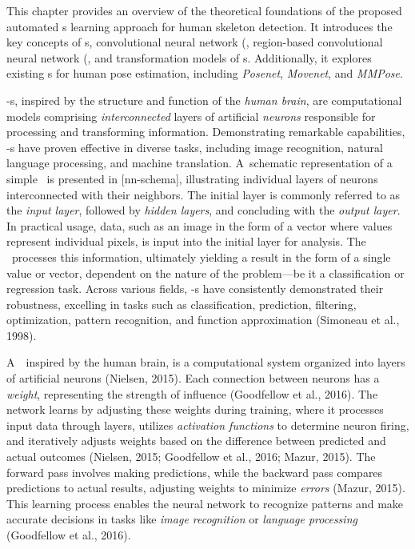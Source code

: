 This chapter provides an overview of the theoretical foundations of the proposed automated \NN\-s learning approach for human skeleton detection. It introduces the key concepts of \NN\-s, convolutional neural network  (\CNN\), region-based convolutional neural network  (\RCNN\), and transformation models of \NN\-s. Additionally, it explores existing \NN\-s for human pose estimation, including {\em Posenet}, {\em Movenet}, and {\em MMPose}.

\NN-s, inspired by the structure and function of the {\em human brain}, are computational models comprising {\em interconnected} layers of artificial {\em neurons} responsible for processing and transforming information. Demonstrating remarkable capabilities, \NN-s have proven effective in diverse tasks, including image recognition, natural language processing, and machine translation. A~schematic representation of a simple \NN\ is presented in [nn-schema], illustrating individual layers of neurons interconnected with their neighbors. The initial layer is commonly referred to as the {\em input layer}, followed by {\em hidden layers}, and concluding with the {\em output layer}. In practical usage, data, such as an image in the form of a vector where values represent individual pixels, is input into the initial layer for analysis. The \NN\ processes this information, ultimately yielding a result in the form of a single value or vector, dependent on the nature of the problem—be it a classification or regression task. Across various fields, \NN-s have consistently demonstrated their robustness, excelling in tasks such as classification, prediction, filtering, optimization, pattern recognition, and function approximation (\scc Simoneau et al., 1998).


A~\NN\, inspired by the human brain, is a computational system organized into layers of artificial neurons (\scc Nielsen, 2015). Each connection between neurons has a {\em weight}, representing the strength of influence (\scc Goodfellow et al., 2016). The network learns by adjusting these weights during training, where it processes input data through layers, utilizes {\em activation functions} to determine neuron firing, and iteratively adjusts weights based on the difference between predicted and actual outcomes (\scc Nielsen, 2015; \scc Goodfellow et al., 2016; \scc Mazur, 2015). The forward pass involves making predictions, while the backward pass compares predictions to actual results, adjusting weights to minimize {\em errors} (\scc Mazur, 2015). This learning process enables the neural network to recognize patterns and make accurate decisions in tasks like {\em image recognition} or {\em language processing} (\scc Goodfellow et al., 2016).

